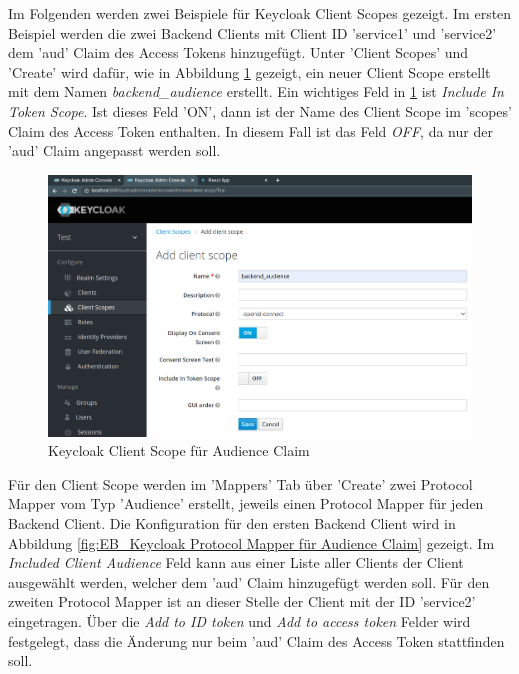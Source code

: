 Im Folgenden werden zwei Beispiele für Keycloak Client Scopes gezeigt. Im ersten Beispiel werden die zwei Backend Clients mit Client ID 'service1' und 'service2' dem 'aud' Claim des Access Tokens hinzugefügt. Unter 'Client Scopes' und 'Create' wird dafür, wie in Abbildung \ref{fig:EB_Keycloak Client Scope für Audience Claim} gezeigt, ein neuer Client Scope erstellt mit dem Namen \textit{backend\_audience} erstellt. Ein wichtiges Feld in \ref{fig:EB_Keycloak Client Scope für Audience Claim} ist \textit{Include In Token Scope}. Ist dieses Feld 'ON', dann ist der Name des Client Scope im 'scopes' Claim des Access Token enthalten. In diesem Fall ist das Feld \textit{OFF}, da nur der 'aud' Claim angepasst werden soll.

\begin{figure}[!h]
	\centering
	\includegraphics[width=1\textwidth]{Images/Ebert/KeycloakNewAudClientScope.PNG}
	\caption{Keycloak Client Scope für Audience Claim}
	\label{fig:EB_Keycloak Client Scope für Audience Claim}
\end{figure}

Für den Client Scope werden im 'Mappers' Tab über 'Create' zwei Protocol Mapper vom Typ 'Audience' erstellt, jeweils einen Protocol Mapper für jeden Backend Client. Die Konfiguration für den ersten Backend Client wird in Abbildung \ref{fig:EB_Keycloak Protocol Mapper für Audience Claim} gezeigt. Im \textit{Included Client Audience} Feld kann aus einer Liste aller Clients der Client ausgewählt werden, welcher dem 'aud' Claim hinzugefügt werden soll. Für den zweiten Protocol Mapper ist an dieser Stelle der Client mit der ID 'service2' eingetragen. Über die \textit{Add to ID token} und \textit{Add to access token} Felder wird festgelegt, dass die Änderung nur beim 'aud' Claim des Access Token stattfinden soll.

